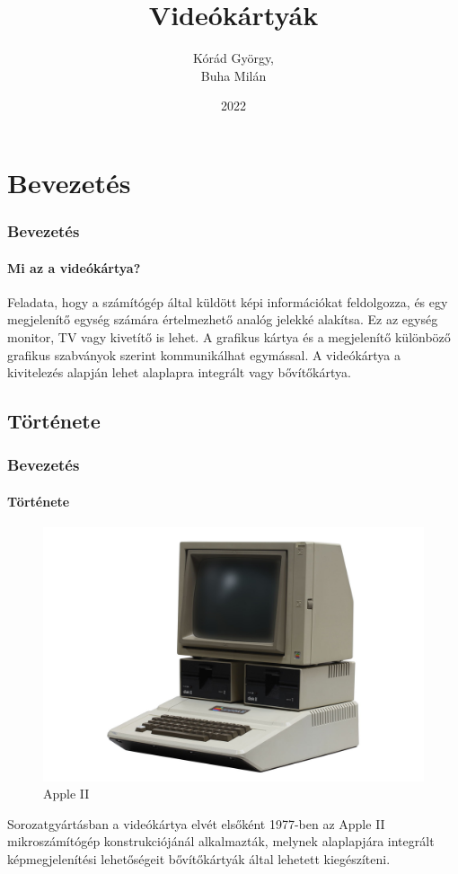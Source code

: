 \documentclass[tikz,border=10pt]{beamer}
\title{Videókártyák}
\author{Kórád György, \\ Buha Milán}
\date{2022}
\begin{document}

\frame{\titlepage}
\frame{\tableofcontents}

\section{Bevezetés}
\begin{frame}
\frametitle{Bevezetés}
\framesubtitle{Mi az a videókártya?}
Feladata, hogy a számítógép által küldött képi információkat feldolgozza, és egy megjelenítő egység számára értelmezhető analóg jelekké alakítsa. Ez az egység monitor, TV vagy kivetítő is lehet. A grafikus kártya és a megjelenítő különböző grafikus szabványok szerint kommunikálhat egymással. A videókártya a kivitelezés alapján lehet alaplapra integrált vagy bővítőkártya.
\end{frame}

\subsection{Története}
\begin{frame}
\frametitle{Bevezetés}
\framesubtitle{Története}
\transwipe[direction=90]
\begin{figure}
    \centering
    \includegraphics[scale=.05]{Media/Apple2.jpg}
    \caption{Apple II}
\end{figure}

Sorozatgyártásban a videókártya elvét elsőként 1977-ben az Apple II mikroszámítógép konstrukciójánál alkalmazták, melynek alaplapjára integrált képmegjelenítési lehetőségeit bővítőkártyák által lehetett kiegészíteni.
\end{frame}
\end{document}
